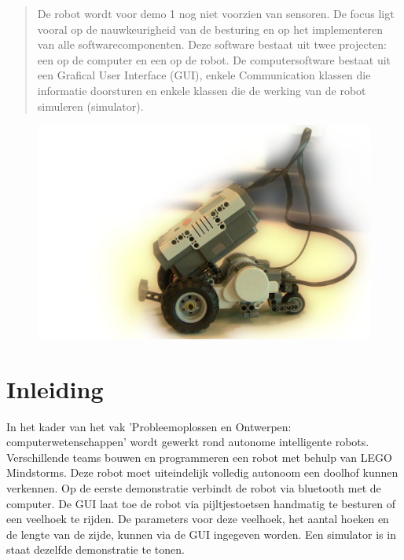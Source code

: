 \documentclass[tt1]{penoverslag}
\begin{document}

\maketitlepage

\begin{abstract}
\label{ssec:abstr}
De robot wordt voor demo 1 nog niet voorzien van sensoren. De focus ligt vooral op de nauwkeurigheid van de besturing en op het implementeren van alle softwarecomponenten. Deze software bestaat uit twee projecten: een op de computer en een op de robot. De computersoftware bestaat uit een Grafical User Interface (GUI), enkele Communication klassen die informatie doorsturen en enkele klassen die de werking van de robot simuleren (simulator).
\end{abstract}

\tableofcontents

\begin{figure}[!b]
\begin{flushright}
    \includegraphics[width=1\textwidth]{robotFP2}
	\label{fig:robotFP}
\end{flushright}
\end{figure}


\newpage

\section{Inleiding}
\label{ssec:inl}
In het kader van het vak 'Probleemoplossen en Ontwerpen: computerwetenschappen' wordt gewerkt rond autonome intelligente robots. Verschillende teams bouwen en programmeren een robot met behulp van LEGO Mindstorms. Deze robot moet uiteindelijk volledig autonoom een doolhof kunnen verkennen.
Op de eerste demonstratie verbindt de robot via bluetooth met de computer. De GUI laat toe de robot via pijltjestoetsen handmatig te besturen of een veelhoek te rijden. De parameters voor deze veelhoek, het aantal hoeken en de lengte van de zijde, kunnen via de GUI ingegeven worden. Een simulator is in staat dezelfde demonstratie te tonen.
\end{document}

